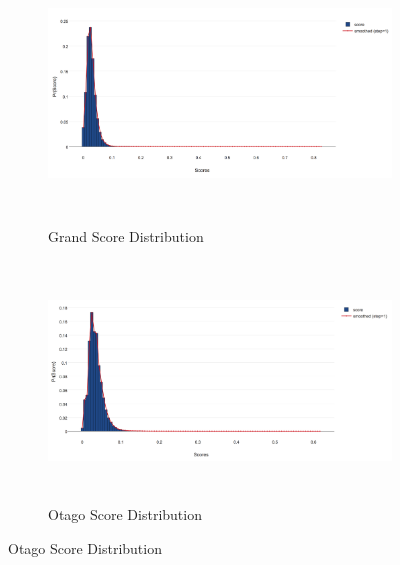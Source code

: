 \begin{figure}[htb]
 \begin{subfigure}[t]{\textwidth}
  \centering
  \includegraphics[height=2.7in]{dataset/grand/scores}
  \caption{Grand Score Distribution}
  \label{fig:grand_scores} %
\end{subfigure}

 \begin{subfigure}[t]{\textwidth}
  \centering
  \includegraphics[height=2.5in]{dataset/otago/scores}
  \caption{Otago Score Distribution}
  \label{fig:otago_scores} %
  \end{subfigure}
\end{figure}
